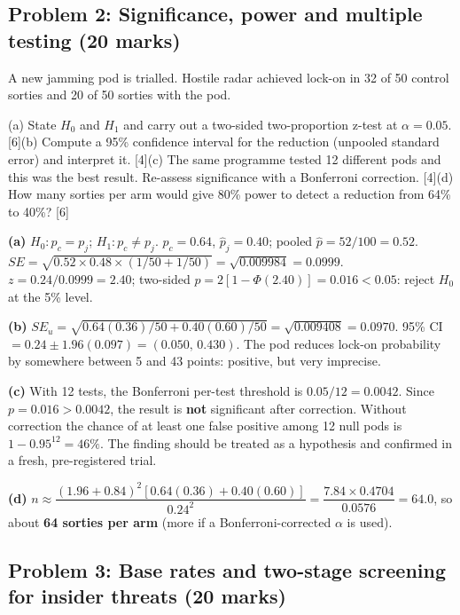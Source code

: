 \documentclass[11pt]{article}
\begin{document}
\subsection{Problem 2: Significance, power and multiple testing \normalfont\small\color{GreyN}(20 marks)}

\begin{prob}A new jamming pod is trialled. Hostile radar achieved lock-on in 32 of 50 control sorties and 20 of 50 sorties with the pod.

(a) State $H_0$ and $H_1$ and carry out a two-sided two-proportion z-test at $\alpha=0.05$. [6]\newline (b) Compute a 95\% confidence interval for the reduction (unpooled standard error) and interpret it. [4]\newline (c) The same programme tested 12 different pods and this was the best result. Re-assess significance with a Bonferroni correction. [4]\newline (d) How many sorties per arm would give 80\% power to detect a reduction from 64\% to 40\%? [6]\end{prob}

\begin{soln}\textbf{(a)} $H_0: p_c=p_j$; $H_1: p_c\ne p_j$. $\hat p_c=0.64$, $\hat p_j=0.40$; pooled $\hat p=52/100=0.52$. $SE=\sqrt{0.52\times0.48\times(1/50+1/50)}=\sqrt{0.009984}=0.0999$. $z=0.24/0.0999=2.40$; two-sided $p=2[1-\Phi(2.40)]=0.016<0.05$: reject $H_0$ at the 5\% level.

\textbf{(b)} $SE_u=\sqrt{0.64(0.36)/50+0.40(0.60)/50}=\sqrt{0.009408}=0.0970$. 95\% CI $=0.24\pm1.96(0.097)=(0.050,\,0.430)$. The pod reduces lock-on probability by somewhere between 5 and 43 points: positive, but very imprecise.

\textbf{(c)} With 12 tests, the Bonferroni per-test threshold is $0.05/12=0.0042$. Since $p=0.016>0.0042$, the result is \textbf{not} significant after correction. Without correction the chance of at least one false positive among 12 null pods is $1-0.95^{12}=46\%$. The finding should be treated as a hypothesis and confirmed in a fresh, pre-registered trial.

\textbf{(d)} $n\approx\dfrac{(1.96+0.84)^2[0.64(0.36)+0.40(0.60)]}{0.24^2}=\dfrac{7.84\times0.4704}{0.0576}=64.0$, so about \textbf{64 sorties per arm} (more if a Bonferroni-corrected $\alpha$ is used).\end{soln}

\subsection{Problem 3: Base rates and two-stage screening for insider threats \normalfont\small\color{GreyN}(20 marks)}
\end{document}
